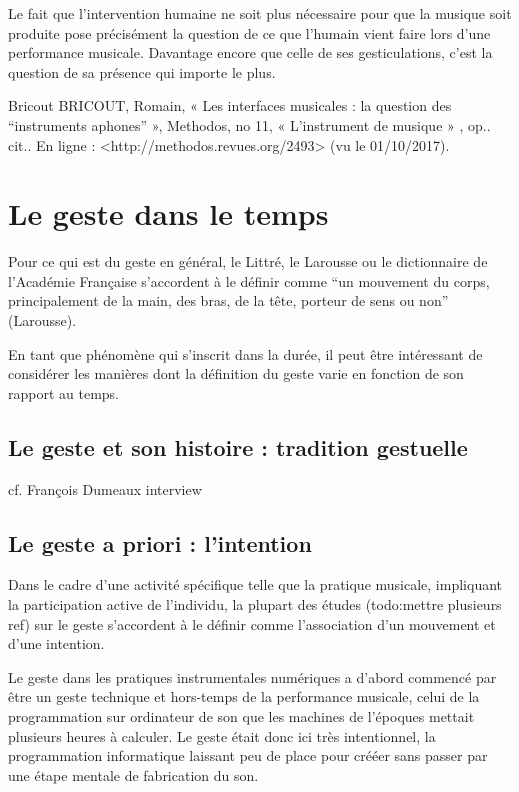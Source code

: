 Le fait que l'intervention humaine ne soit plus nécessaire pour que la musique soit produite pose précisément la question de ce que l'humain vient faire lors d'une performance musicale. Davantage encore que celle de ses gesticulations, c'est la question de sa présence qui importe le plus.

 Bricout BRICOUT, Romain, « Les interfaces musicales : la question des “instruments aphones” », Methodos, no 11, « L’instrument de musique » , op.. cit.. En ligne : <http://methodos.revues.org/2493> (vu le 01/10/2017). 



\section{Le geste dans le temps}

Pour ce qui est du geste en général, le Littré, le Larousse ou le dictionnaire de l'Académie Française s'accordent à le définir comme ``un mouvement du corps, principalement de la main, des bras, de la tête, porteur de sens ou non'' (Larousse).

En tant que phénomène qui s'inscrit dans la durée, il peut être intéressant de considérer les manières dont la définition du geste varie en fonction de son rapport au temps.

\subsection{Le geste et son histoire : tradition gestuelle}
cf. François Dumeaux interview

\subsection{Le geste a priori : l'intention}


Dans le cadre d'une activité spécifique telle que la pratique musicale, impliquant la participation active de l'individu, la plupart des études (todo:mettre plusieurs ref) sur le geste s'accordent à le définir comme l'association d'un mouvement et d'une intention.

Le geste dans les pratiques instrumentales numériques a d'abord commencé par être un geste technique et hors-temps de la performance musicale, celui de la programmation sur ordinateur de son que les machines de l'époques mettait plusieurs heures à calculer. Le geste était donc ici très intentionnel, la programmation informatique laissant peu de place pour crééer sans passer par une étape mentale de fabrication du son.


